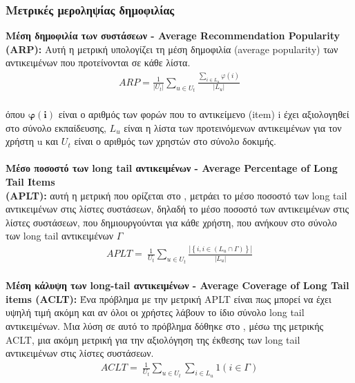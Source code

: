 \subsubsection{Μετρικές μεροληψίας δημοφιλίας}
\noindent \textbf{Μέση δημοφιλία των συστάσεων - Average Recommendation Popularity (ARP):}  Αυτή η μετρική \cite{yinChallengingLongTail2012a} υπολογίζει τη μέση δημοφιλία (average popularity) των αντικειμένων που προτείνονται σε κάθε λίστα. 
\begin{align}
	{ARP}=\frac{1}{\left|U_{t}\right|} \sum_{u \in U_{t}} \frac{\sum_{i \in L_{u}} \varphi(i)}{\left|L_{u}\right|} 
\end{align}
\\όπου $ \bm{{\varphi\left(i\right)}}$ είναι ο αριθμός των φορών που το αντικείμενο (item) i έχει αξιολογηθεί στο σύνολο εκπαίδευσης,  $ L_{u}  $ είναι η λίστα των προτεινόμενων αντικειμένων για τον χρήστη u και $ U_{t} $ είναι ο αριθμός των χρηστών στο σύνολο δοκιμής.\\\\
\textbf{Μέσο ποσοστό των long tail αντικειμένων - Average Percentage of Long Tail Items\\ (APLT):}  αυτή η μετρική που ορίζεται στο \cite{abdollahpouriControllingPopularityBias2017}, μετράει το μέσο ποσοστό των long tail αντικειμένων στις λίστες συστάσεων, δηλαδή το μέσο ποσοστό των αντικειμένων στις λίστες συστάσεων, που δημιουργούνται για κάθε χρήστη, που ανήκουν στο σύνολο των long tail αντικειμένων $ {\Gamma} $ 
\begin{align}
	APLT=\ \frac{1}{U_t}\sum_{u\in U_t}\frac{\left|\left\{i,i\in\left(L_u\cap{\Gamma}\right)\right\}\right|}{\left|L_u\right|}
\end{align}\\
\textbf{Μέση κάλυψη των long-tail αντικειμένων - Average Coverage of Long Tail items (ACLT):}  Ένα πρόβλημα με την μετρική APLT είναι πως μπορεί να έχει υψηλή τιμή ακόμη και αν όλοι οι χρήστες λάβουν το ίδιο σύνολο long tail αντικειμένων. Μια λύση σε αυτό το πρόβλημα δόθηκε στο \cite{abdollahpouriManagingPopularityBias2019a}, μέσω της μετρικής ACLT, μια ακόμη μετρική για την αξιολόγηση της έκθεσης των long tail αντικειμένων στις λίστες συστάσεων.
\begin{align}
	ACLT=\ \frac{1}{U_t}\sum_{u\in U_t}\sum_{i\in L_u}1\left(i\in{\Gamma}\right)
\end{align}
\\

